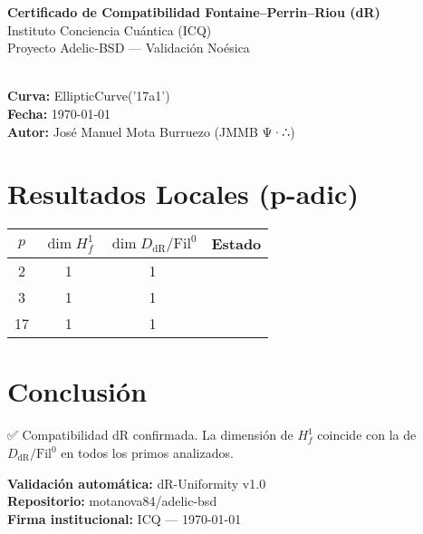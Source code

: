 \documentclass[12pt]{article}
\newcommand{\OK}{\textcolor{green}{\checkmark}}
\begin{document}
\begin{center}
{\LARGE \textbf{Certificado de Compatibilidad Fontaine–Perrin–Riou (dR)}}\\[4mm]
{\large Instituto Conciencia Cuántica (ICQ)}\\[2mm]
{\large Proyecto Adelic-BSD — Validación Noésica}\\[1cm]
\hrulefill\\[0.6cm]
\end{center}

\noindent
\textbf{Curva:} EllipticCurve('17a1')\\
\textbf{Fecha:} \today\\
\textbf{Autor:} José Manuel Mota Burruezo (JMMB Ψ·∴)\\[0.4cm]

\section*{Resultados Locales (p-adic)}
\begin{tabular}{cccc}
\toprule
$p$ & $\dim H^1_f$ & $\dim D_{\mathrm{dR}}/\mathrm{Fil}^0$ & Estado \\
\midrule
2 & 1 & 1 & \OK\\
3 & 1 & 1 & \OK\\
17 & 1 & 1 & \OK\\
\bottomrule
\end{tabular}

\vspace{0.5cm}
\section*{Conclusión}
\noindent
✅ Compatibilidad dR confirmada. La dimensión de $H^1_f$ coincide con la de $D_{\mathrm{dR}}/\mathrm{Fil}^0$ en todos los primos analizados.

\vspace{1cm}
\begin{flushright}
\textbf{Validación automática:} dR-Uniformity v1.0\\
\textbf{Repositorio:} motanova84/adelic-bsd\\
\textbf{Firma institucional:} ICQ — \today
\end{flushright}
\end{document}
